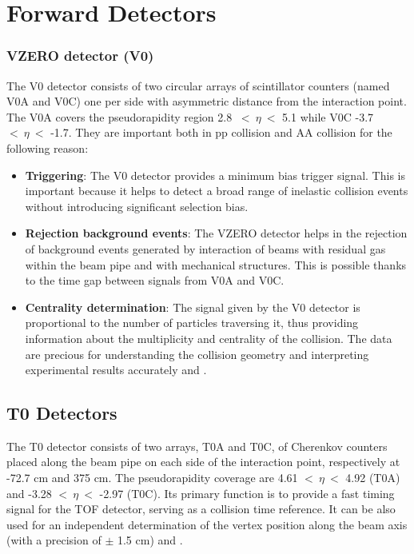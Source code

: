 \documentclass[12pt,a4paper]{book}
\begin{document}
	\section{Forward Detectors}
	\subsubsection{VZERO detector (V0)} 
	The V0 detector consists of two circular arrays of scintillator counters (named V0A and V0C) one per side with asymmetric distance from the interaction point. The V0A covers the pseudorapidity region 2.8 $\ <\ \eta \ <$ 5.1 while V0C -3.7 $<\ \eta \ <$ -1.7. They are important both in pp collision and AA collision for the following reason:
	\begin{itemize}
		\item \textbf{Triggering}: The V0 detector provides a minimum bias trigger signal. This is important because it helps to detect a broad range of inelastic collision events without introducing significant selection bias.
		\item \textbf{Rejection background events}: The VZERO detector helps in the rejection of background events generated by interaction of beams with residual gas within the beam pipe and with mechanical structures. This is possible thanks to the time gap between signals from V0A and V0C.
		\item \textbf{Centrality determination}: The signal given by the V0 detector is proportional to
		the number of particles traversing it, thus providing information about the multiplicity and centrality of the collision. The data are precious for understanding the collision geometry and interpreting experimental results accurately \cite{Padhan:2924203} and \cite{amsdottorato9036}.
	\end{itemize}	
	
	\subsection{T0 Detectors}
	The T0 detector consists of two arrays, T0A and T0C, of Cherenkov counters placed along the beam pipe on each side of the interaction point, respectively at -72.7 cm and 375 cm.  The pseudorapidity coverage are	4.61 $<\ \eta\ <$ 4.92 (T0A) and -3.28 $<\ \eta\ <$ -2.97 (T0C). Its primary function is to provide a fast timing signal for the TOF detector, serving as a collision time reference. It can be also used for an independent determination of the vertex position along the beam axis (with a precision of $\pm$ 1.5 cm) \cite{Padhan:2924203} and \cite{amsdottorato9036}.	
	
\end{document}
